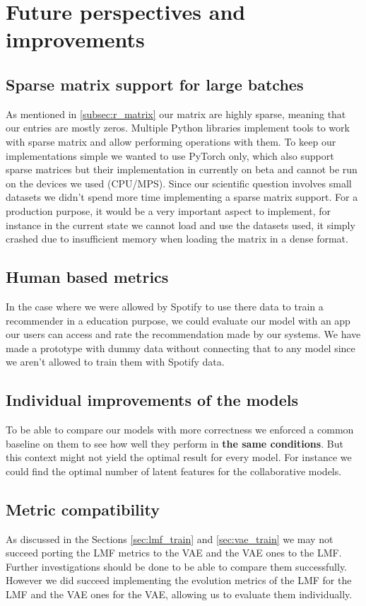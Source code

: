 \chapter{Future perspectives and improvements}
\section{Sparse matrix support for large batches}
As mentioned in \ref{subsec:r_matrix} our matrix are highly sparse, meaning that our entries are mostly zeros. Multiple  Python libraries implement tools to work with sparse matrix and allow performing operations with them. To keep our implementations simple we wanted to use PyTorch only, which also support sparse matrices but their implementation in currently on beta and cannot be run on the devices we used (CPU/MPS). Since our scientific question involves small datasets we didn't spend more time implementing a sparse matrix support. For a production purpose, it would be a very important aspect to implement, for instance in the current state we cannot load and use the datasets \cite{liang2018variational} used, it simply crashed due to insufficient memory when loading the matrix in a dense format.

\section{Human based metrics}
In the case where we were allowed by Spotify to use there data to train a recommender in a education purpose, we could evaluate our model with an app our users can access and rate the recommendation made by our systems. We have made a prototype with dummy data without connecting that to any model since we aren't allowed to train them with Spotify data.

\section{Individual improvements of the models}
To be able to compare our models with more correctness we enforced a common baseline on them to see how well they perform in \textbf{the same conditions}. But this context might not yield the optimal result for every model. For instance we could find the optimal number of latent features for the collaborative models.

\section{Metric compatibility}
As discussed in the Sections \ref{sec:lmf_train} and \ref{sec:vae_train} we may not succeed porting the LMF metrics to the VAE and the VAE ones to the LMF. Further investigations should be done to be able to compare them successfully. However we did succeed implementing the evolution metrics of the LMF for the LMF and the VAE ones for the VAE, allowing us to evaluate them individually.

